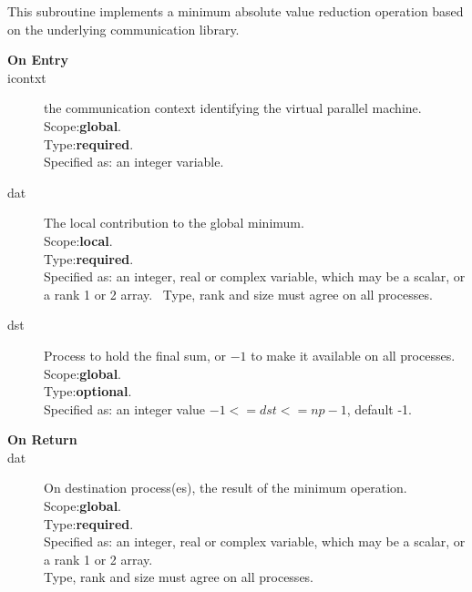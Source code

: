 This subroutine implements a minimum absolute value reduction
operation based on the underlying communication library. 
\begin{description}
\item[\bf  On Entry ]
\item[icontxt] the communication context identifying the virtual
  parallel machine.\\
Scope:{\bf global}.\\
Type:{\bf required}.\\
Specified as: an integer variable.
\item[dat] The local contribution to the global minimum.\\
Scope:{\bf local}.\\
Type:{\bf required}.\\
Specified as: an integer, real or complex variable, which may be a
scalar, or a rank 1 or 2 array. \
Type, rank and size must agree on all processes.
\item[dst] Process to hold the final sum, or $-1$ to make it available
  on all processes.\\
Scope:{\bf global}.\\
Type:{\bf optional}.\\
Specified as: an integer value $-1<= dst <= np-1$, default -1. \\
\end{description}


\begin{description}
\item[\bf On Return]
\item[dat] On destination process(es), the result of the minimum operation.\\
Scope:{\bf global}.\\
Type:{\bf required}.\\
Specified as: an integer, real or complex variable, which may be a
scalar, or a rank 1 or 2 array. \\
Type, rank and size must agree on all processes.
\end{description}




